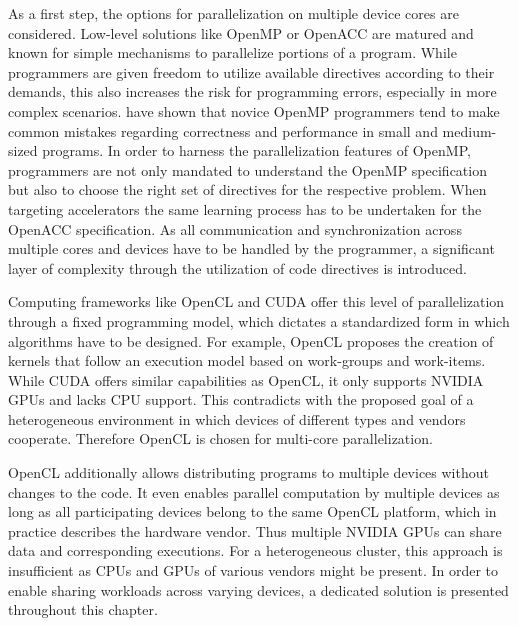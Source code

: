 As a first step, the options for parallelization on multiple device cores are considered. Low-level solutions like OpenMP or OpenACC are matured and known for simple mechanisms to parallelize portions of a program. While programmers are given freedom to utilize available directives according to their demands, this also increases the risk for programming errors, especially in more complex scenarios. \citeauthor{openmp_mistakes} have shown that novice OpenMP programmers tend to make common mistakes regarding correctness and performance in small and medium-sized programs\cite{openmp_mistakes}. In order to harness the parallelization features of OpenMP, programmers are not only mandated to understand the OpenMP specification but also to choose the right set of directives for the respective problem. When targeting accelerators the same learning process has to be undertaken for the OpenACC specification. As all communication and synchronization across multiple cores and devices have to be handled by the programmer, a significant layer of complexity through the utilization of code directives is introduced.

Computing frameworks like OpenCL and CUDA offer this level of parallelization through a fixed programming model, which dictates a standardized form in which algorithms have to be designed. For example, OpenCL proposes the creation of kernels that follow an execution model based on work-groups and work-items. While CUDA offers similar capabilities as OpenCL, it only supports NVIDIA GPUs and lacks CPU support. This contradicts with the proposed goal of a heterogeneous environment in which devices of different types and vendors cooperate. Therefore OpenCL is chosen for multi-core parallelization.

OpenCL additionally allows distributing programs to multiple devices without changes to the code. It even enables parallel computation by multiple devices as long as all participating devices belong to the same OpenCL platform, which in practice describes the hardware vendor. Thus multiple NVIDIA GPUs can share data and corresponding executions. For a heterogeneous cluster, this approach is insufficient as CPUs and GPUs of various vendors might be present. In order to enable sharing workloads across varying devices, a dedicated solution is presented throughout this chapter.

